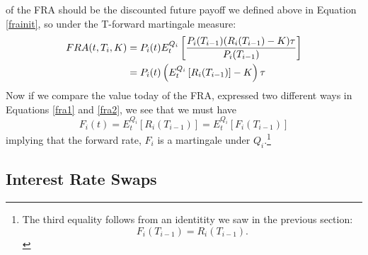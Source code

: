 \documentclass[a4paper,12pt]{scrartcl}
\begin{document}
of the FRA should be the discounted future payoff we defined
above in Equation \ref{frainit}, 
so under the T-forward martingale measure:
\begin{align}
   \label{fra2}
   FRA(t,T_i,K) &= P_i(t) E^{Q_i}_t\left[ \frac{P_i(T_{i-1})(R_i(T_{i-1})
      -K)\tau}{P_i(T_{i-1})} \right] \notag\\
      &= P_i(t) \left( E^{Q_i}_t\left[ R_i(T_{i-1})\right] - K\right)
	 \tau
\end{align}
Now if we compare the value today of the FRA, 
expressed two different ways in Equations
\ref{fra1} and \ref{fra2}, we see that we must have
   \[ F_i(t) = E^{Q_i}_t\left[ R_i(T_{i-1})\right] = 
   E^{Q_i}_t\left[ F_i(T_{i-1})\right] \]
implying that the forward rate, $F_i$ is a martingale under 
$Q_i$.\footnote{The third equality follows from an identitity we saw
   in the previous section:
   \[ F_i(T_{i-1}) = R_i(T_{i-1}). \]}

\newpage

\subsection{Interest Rate Swaps}
\end{document}

